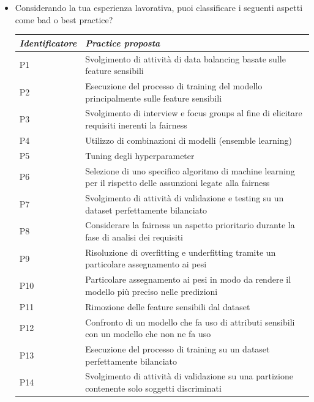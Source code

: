 \begin{itemize}
    \item Considerando la tua esperienza lavorativa, puoi classificare i seguenti aspetti come bad o best practice?
    \begin{longtable}{| p{} | p{} |}
      \hline\textbf{\textit{Identificatore}} & \textbf{\textit{Practice proposta}}
        \\ \hline
        \rowcolor{Gray!30}
        P1 & Svolgimento di attività di data balancing basate sulle feature sensibili
        \\ \hline
        P2 & Esecuzione del processo di training del modello principalmente sulle feature sensibili
        \\ \hline
        \rowcolor{Gray!30}
        P3 & Svolgimento di interview e focus groups al fine di elicitare requisiti inerenti la fairness
         \\ \hline
        P4 & Utilizzo di combinazioni di modelli (ensemble learning)
        \\ \hline
        \rowcolor{Gray!30}
        P5 & Tuning degli hyperparameter
        \\ \hline
        P6 & Selezione di uno specifico algoritmo di machine learning per il rispetto delle assunzioni legate alla fairness
        \\ \hline
        \rowcolor{Gray!30}
        P7 & Svolgimento di attività di validazione e testing su un dataset perfettamente bilanciato
         \\ \hline
        P8 & Considerare la fairness un aspetto prioritario durante la fase di analisi dei requisiti
        \\ \hline
        \rowcolor{Gray!30}
        P9 & Risoluzione di overfitting e underfitting tramite un particolare assegnamento ai pesi
        \\ \hline
        P10 & Particolare assegnamento ai pesi in modo da rendere il modello più preciso nelle predizioni
        \\ \hline
        \rowcolor{Gray!30}
        P11 & Rimozione delle feature sensibili dal dataset
         \\ \hline
        P12 & Confronto di un modello che fa uso di attributi sensibili con un modello che non ne fa uso
        \\ \hline
        \rowcolor{Gray!30}
        P13 & Esecuzione del processo di training su un dataset perfettamente bilanciato
         \\ \hline
        P14 & Svolgimento di attività di validazione su una partizione contenente solo soggetti discriminati

\end{longtable}
\end{itemize}
